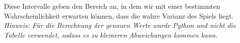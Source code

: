\documentclass[main.tex]{subfiles}
\begin{document}
Diese Intervalle geben den Bereich an, in dem wir mit einer bestimmten Wahrscheinlichkeit erwarten können, dass die wahre Varianz des Spiels liegt.\\

\textit{Hinweis: Für die Berechnung der genauen Werte wurde Python und nicht die Tabelle verwendet, sodass es zu kleineren Abweichungen kommen kann.}
\end{document}

